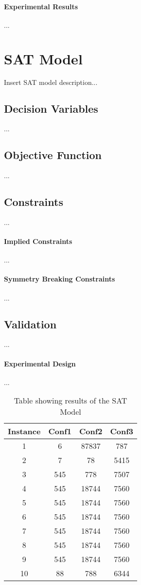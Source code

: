 \documentclass{article}
\begin{document}
\paragraph{Experimental Results}
...

\section{SAT Model}
Insert SAT model description...
\subsection{Decision Variables}
...
\subsection{Objective Function}
...
\subsection{Constraints}
...
\paragraph{Implied Constraints}
...
\paragraph{Symmetry Breaking Constraints}
...
\subsection{Validation}
...
\paragraph{Experimental Design}
...
\begin{table}[h!]
\centering
\begin{tabular}{|c | c c c|} 
 \hline
 Instance & Conf1 & Conf2 & Conf3\\ [0.5ex] 
 \hline\hline
 1 & 6 & 87837 & 787 \\ 
 2 & 7 & 78 & 5415 \\
 3 & 545 & 778 & 7507 \\
 4 & 545 & 18744 & 7560 \\
 5 & 545 & 18744 & 7560 \\
 6 & 545 & 18744 & 7560 \\
 7 & 545 & 18744 & 7560 \\
 8 & 545 & 18744 & 7560 \\
 9 & 545 & 18744 & 7560 \\
 10 & 88 & 788 & 6344 \\ [1ex] 
 \hline
\end{tabular}
\caption{Table showing results of the SAT Model}
\label{table:1}
\end{table}
\end{document}
